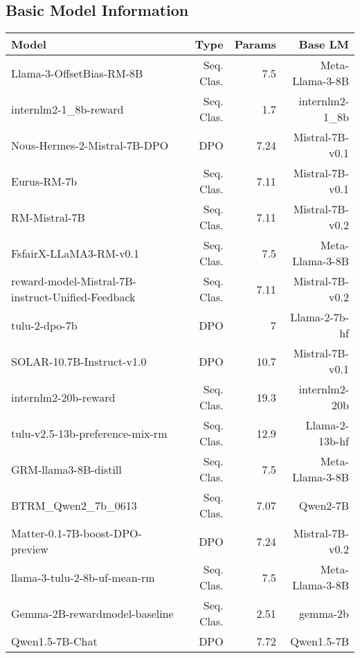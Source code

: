 \subsection{Basic Model Information}
\label{app:reward-models-basic-info}
\begin{table*}[h]
\small
\begin{center}
\begin{tabular}{lrrr}
\toprule
\textbf{Model} & \textbf{Type} & \textbf{Params} & \textbf{Base LM} \\
\midrule
Llama-3-OffsetBias-RM-8B \cite{park2024offsetbias} & Seq. Clas. & 7.5 & Meta-Llama-3-8B \\
internlm2-1\_8b-reward \cite{cai2024internlm2} & Seq. Clas. & 1.7 & internlm2-1\_8b \\
Nous-Hermes-2-Mistral-7B-DPO \cite{Nous-Hermes-2-Mistral-7B-DPO} & DPO & 7.24 & Mistral-7B-v0.1 \\
Eurus-RM-7b \cite{yuan2024advancing} & Seq. Clas.& 7.11 & Mistral-7B-v0.1 \\
RM-Mistral-7B \cite{dong2023raft, xiong2024iterative} & Seq. Clas. & 7.11 & Mistral-7B-v0.2 \\
FsfairX-LLaMA3-RM-v0.1 \cite{dong2023raft, xiong2024iterative} & Seq. Clas. & 7.5 & Meta-Llama-3-8B \\
reward-model-Mistral-7B-instruct-Unified-Feedback \cite{yang2024regularizing} & Seq. Clas. & 7.11 & Mistral-7B-v0.2 \\
tulu-2-dpo-7b \cite{ivison2023camels} & DPO & 7 & Llama-2-7b-hf \\
SOLAR-10.7B-Instruct-v1.0 \cite{kim2023solar, kim2024sdpo} & DPO & 10.7 & Mistral-7B-v0.1 \\
internlm2-20b-reward \cite{cai2024internlm2} & Seq. Clas. & 19.3 & internlm2-20b \\
tulu-v2.5-13b-preference-mix-rm \cite{ivison2024unpacking} & Seq. Clas. & 12.9 & Llama-2-13b-hf \\
GRM-llama3-8B-distill \cite{yang2024regularizing} & Seq. Clas. & 7.5 & Meta-Llama-3-8B \\
BTRM\_Qwen2\_7b\_0613 \cite{qwen2} & Seq. Clas. & 7.07 & Qwen2-7B \\
Matter-0.1-7B-boost-DPO-preview \cite{jiang2023mistral} & DPO & 7.24 & Mistral-7B-v0.2 \\
llama-3-tulu-2-8b-uf-mean-rm \cite{ivison2024unpacking} & Seq. Clas. & 7.5 & Meta-Llama-3-8B \\
Gemma-2B-rewardmodel-baseline \cite{yang2024regularizing} & Seq. Clas. & 2.51 & gemma-2b \\
Qwen1.5-7B-Chat \cite{qwen} & DPO & 7.72 & Qwen1.5-7B \\
\bottomrule
\end{tabular}
\caption{Reward model details. The model names correspond to HuggingFace\footnote{\url{https://huggingface.co/}} models.}
\label{tab:reward-model-basic-info}
\end{center}
\end{table*}

